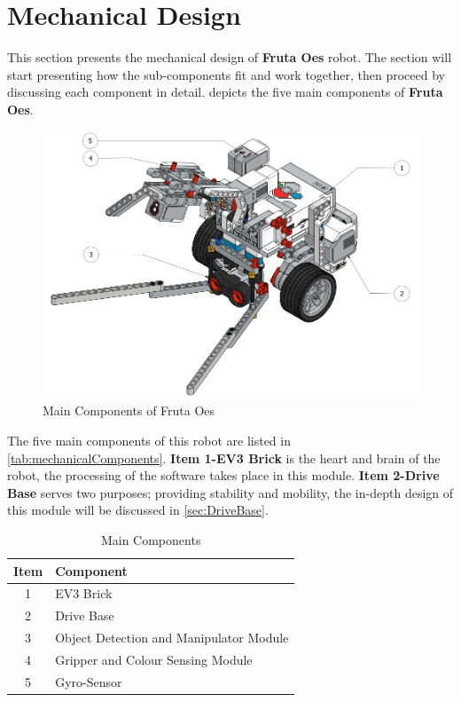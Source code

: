\section{Mechanical Design}\label{sec:mechanicalDesign}

\noindent This section presents the mechanical design of \textbf{Fruta Oes} robot. The section will start presenting how the sub-components fit and work together, then proceed by discussing each component in detail.  depicts the five main components of \textbf{Fruta Oes}.
\begin{figure}[!ht]
	\centering
	\includegraphics[width=0.8\linewidth]{Graphics/LabelledFruta}
	\caption{Main Components of Fruta Oes}
	\label{fig:labelledfruta}
\end{figure}

\noindent The five main components of this robot are listed in \vref{tab:mechanicalComponents}. \textbf{Item 1-EV3 Brick} is the heart and brain of the robot, the processing of the software takes place in this module. \textbf{Item 2-Drive Base} serves two purposes; providing stability and mobility, the in-depth design of this module will be discussed in \vref{sec:DriveBase}.

	\begin{table}[!ht]
	\centering
	\caption{Main Components}
	\vspace{-2mm}
	\label{tab:mechanicalComponents}
		\begin{tabular}{cl}
			\hline
			\textbf{Item}&\textbf{Component}\\
			\hline
			1&EV3 Brick\\
			2&Drive Base\\
			3&Object Detection and Manipulator Module\\
			4&Gripper and Colour Sensing Module\\
			5&Gyro-Sensor\\
			\hline			
		\end{tabular}
\end{table}

